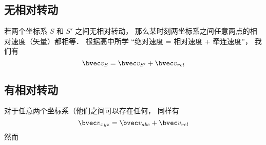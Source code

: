 

\subsection{无相对转动}
若两个坐标系 $S$ 和 $S'$ 之间无相对转动， 那么某时刻两坐标系之间任意两点的相对速度（矢量）都相等． 根据高中所学 “绝对速度 = 相对速度 + 牵连速度”， 我们有
\begin{equation}
\bvec v_{S} = \bvec v_{S'} + \bvec v_{rel}
\end{equation}


\subsection{有相对转动}
对于任意两个坐标系（他们之间可以存在任何， 同样有
\begin{equation}
\bvec v_{xyz} = \bvec v_{abc} + \bvec v_{rel}
\end{equation}
然而
